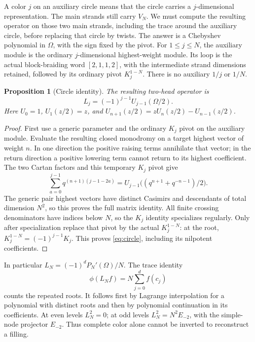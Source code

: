 \documentclass[11pt]{article}
\numberwithin{equation}{section}
\newtheorem{proposition}[theorem]{Proposition}
\theoremstyle{definition}\newtheorem{definition}[theorem]{Definition}
\theoremstyle{remark}\newtheorem{remark}[theorem]{Remark}
\begin{document}
A color $j$ on an auxiliary circle means that the circle carries a $j$-dimensional representation. The main strands still carry $V_N$. We must compute the resulting operator on those two main strands, including the trace around the auxiliary circle, before replacing that circle by twists. The answer is a Chebyshev polynomial in $\Omega$, with the sign fixed by the pivot.
For $1\le j\le N$, the auxiliary module is the ordinary $j$-dimensional highest-weight module. Its loop is the actual block-braiding word $[2,1,1,2]$, with the intermediate strand dimensions retained, followed by its ordinary pivot $K_j^{1-N}$. There is no auxiliary $1/j$ or $1/N$.

\begin{proposition}[Circle identity]\label{prop:circle}
The resulting two-head operator is
\begin{equation}\label{eq:circle}
 L_j=(-1)^{j-1}U_{j-1}(\Omega/2).
\end{equation}
Here $U_0=1$, $U_1(z/2)=z$, and $U_{n+1}(z/2)=zU_n(z/2)-U_{n-1}(z/2)$.
\end{proposition}
\begin{proof}
First use a generic parameter and the ordinary $K_j$ pivot on the
auxiliary module. Evaluate the resulting closed monodromy on a target
highest vector of weight $n$. In one direction the positive raising terms annihilate that vector; in the return direction a positive lowering term cannot return to its highest coefficient. The two Cartan factors and this temporary $K_j$ pivot give
\[
 \sum_{a=0}^{j-1}q^{(n+1)(j-1-2a)}
 =U_{j-1}\bigl((q^{n+1}+q^{-n-1})/2\bigr).
\]
The generic pair highest vectors have distinct Casimirs and descendants of total dimension $N^2$, so this proves the full matrix identity. All finite crossing denominators have indices below $N$, so the
$K_j$ identity specializes regularly. Only after specialization replace
that pivot by the actual $K_j^{1-N}$: at the root,
$K_j^{1-N}=(-1)^{j-1}K_j$. This proves \eqref{eq:circle}, including its nilpotent coefficients.
\end{proof}

In particular $L_N=(-1)^dP_N'(\Omega)/N$. The trace identity
\begin{equation}\label{eq:circle-trace}
 \phi(L_Nf)=N\sum_{j=0}^{d}f(c_j)
\end{equation}
counts the repeated roots. It follows first by Lagrange interpolation for a polynomial with distinct roots and then by polynomial continuation in its coefficients. At even levels $L_N^2=0$; at odd levels $L_N^2=N^2E_{-2}$, with the simple-node projector $E_{-2}$. Thus complete color alone cannot be inverted to reconstruct a filling.
\end{document}
